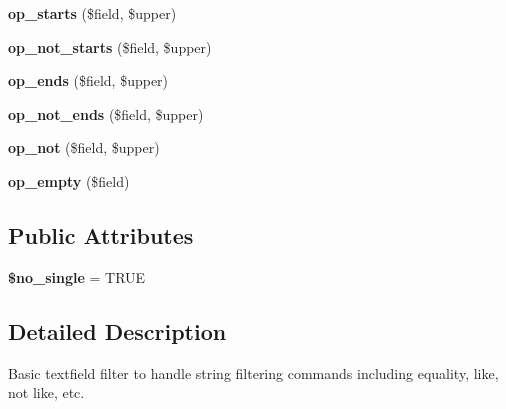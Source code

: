 \begin{CompactItemize}
\item 
\hypertarget{classviews__handler__filter__string_fb6f788adca81a68152cf71702f33a52}{
\textbf{op\_\-starts} (\$field, \$upper)}
\label{classviews__handler__filter__string_fb6f788adca81a68152cf71702f33a52}

\item 
\hypertarget{classviews__handler__filter__string_48ceb8459f18510d2c35e1d4c7f91d13}{
\textbf{op\_\-not\_\-starts} (\$field, \$upper)}
\label{classviews__handler__filter__string_48ceb8459f18510d2c35e1d4c7f91d13}

\item 
\hypertarget{classviews__handler__filter__string_3c2963225fe0225df939561964cc08f9}{
\textbf{op\_\-ends} (\$field, \$upper)}
\label{classviews__handler__filter__string_3c2963225fe0225df939561964cc08f9}

\item 
\hypertarget{classviews__handler__filter__string_f9a41e86c7ad8e22451e9b98d3cf4d1a}{
\textbf{op\_\-not\_\-ends} (\$field, \$upper)}
\label{classviews__handler__filter__string_f9a41e86c7ad8e22451e9b98d3cf4d1a}

\item 
\hypertarget{classviews__handler__filter__string_72a72fa43fc2efdaa9e4a04415f39d25}{
\textbf{op\_\-not} (\$field, \$upper)}
\label{classviews__handler__filter__string_72a72fa43fc2efdaa9e4a04415f39d25}

\item 
\hypertarget{classviews__handler__filter__string_49bb95c89ac8e7db497b9a54b9b881bb}{
\textbf{op\_\-empty} (\$field)}
\label{classviews__handler__filter__string_49bb95c89ac8e7db497b9a54b9b881bb}

\end{CompactItemize}
\subsection*{Public Attributes}
\begin{CompactItemize}
\item 
\hypertarget{classviews__handler__filter__string_6a89d02cc303e8752f3a931f18c25e95}{
\textbf{\$no\_\-single} = TRUE}
\label{classviews__handler__filter__string_6a89d02cc303e8752f3a931f18c25e95}

\end{CompactItemize}


\subsection{Detailed Description}
Basic textfield filter to handle string filtering commands including equality, like, not like, etc. 

